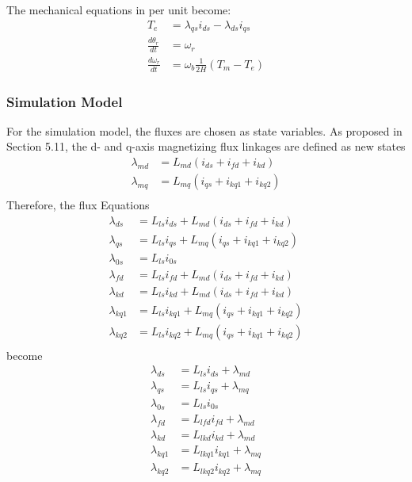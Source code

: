 The mechanical equations in per unit become:
%
\begin{align}
T_e &= \lambda_{qs} i_{ds} - \lambda_{ds} i_{qs} \\
\frac{d\theta_r}{dt} &= \omega_r \label{eq:d_theta} \\
\frac{d\omega_r}{dt} &= \omega_{b} \frac{1}{2H} (T_m-T_e)
\end{align}
%


\subsubsection{Simulation Model}
For the simulation model, the fluxes are chosen as state variables. As proposed in \cite{krause2002} Section 5.11, the d- and q-axis magnetizing flux linkages are defined as new states
%
\begin{align}
  \lambda_{md} &= L_{md} \left( i_{ds} + i_{fd} + i_{kd} \right) \\
  \lambda_{mq} &= L_{mq} \left( i_{qs} + i_{kq1} + i_{kq2} \right) \\  
\end{align}
%
Therefore, the flux Equations
%
\begin{align}
  \lambda_{ds} &= L_{ls} i_{ds} + L_{md} \left( i_{ds} + i_{fd} + i_{kd} \right) \\
  \lambda_{qs} &= L_{ls} i_{qs} + L_{mq} \left( i_{qs} + i_{kq1} + i_{kq2} \right) \\
  \lambda_{0s} &= L_{ls} i_{0s} \\
  \lambda_{fd} &= L_{ls} i_{fd} + L_{md} \left( i_{ds} + i_{fd} + i_{kd} \right) \\
  \lambda_{kd} &= L_{ls} i_{kd} + L_{md} \left( i_{ds} + i_{fd} + i_{kd} \right) \\
  \lambda_{kq1} &= L_{ls} i_{kq1} + L_{mq} \left( i_{qs} + i_{kq1} + i_{kq2} \right) \\
  \lambda_{kq2} &= L_{ls} i_{kq2} + L_{mq} \left( i_{qs} + i_{kq1} + i_{kq2} \right) \\
\end{align}
%
become
%
\begin{align}
  \lambda_{ds} &= L_{ls} i_{ds} + \lambda_{md} \\
  \lambda_{qs} &= L_{ls} i_{qs} + \lambda_{mq} \\
  \lambda_{0s} &= L_{ls} i_{0s} \\
  \lambda_{fd} &= L_{lfd} i_{fd} + \lambda_{md} \\
  \lambda_{kd} &= L_{lkd} i_{kd} + \lambda_{md} \\
  \lambda_{kq1} &= L_{lkq1} i_{kq1} + \lambda_{mq} \\
  \lambda_{kq2} &= L_{lkq2} i_{kq2} + \lambda_{mq}
\end{align}
